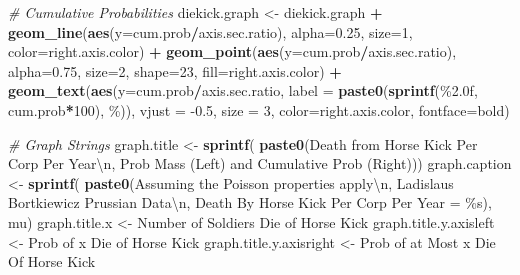 \documentclass[
]{book}
\newenvironment{Shaded}{\begin{snugshade}}{\end{snugshade}}
\newcommand{\CharTok}[1]{\textcolor[rgb]{0.31,0.60,0.02}{#1}}
\newcommand{\CommentTok}[1]{\textcolor[rgb]{0.56,0.35,0.01}{\textit{#1}}}
\newcommand{\DataTypeTok}[1]{\textcolor[rgb]{0.13,0.29,0.53}{#1}}
\newcommand{\DecValTok}[1]{\textcolor[rgb]{0.00,0.00,0.81}{#1}}
\newcommand{\FloatTok}[1]{\textcolor[rgb]{0.00,0.00,0.81}{#1}}
\newcommand{\KeywordTok}[1]{\textcolor[rgb]{0.13,0.29,0.53}{\textbf{#1}}}
\newcommand{\NormalTok}[1]{#1}
\newcommand{\OperatorTok}[1]{\textcolor[rgb]{0.81,0.36,0.00}{\textbf{#1}}}
\newcommand{\StringTok}[1]{\textcolor[rgb]{0.31,0.60,0.02}{#1}}
\begin{document}
\begin{Shaded}
\begin{Highlighting}[]
\CommentTok{\# Cumulative Probabilities}
\NormalTok{diekick.graph \textless{}{-}}\StringTok{ }\NormalTok{diekick.graph }\OperatorTok{+}
\StringTok{    }\KeywordTok{geom\_line}\NormalTok{(}\KeywordTok{aes}\NormalTok{(}\DataTypeTok{y=}\NormalTok{cum.prob}\OperatorTok{/}\NormalTok{axis.sec.ratio),}
              \DataTypeTok{alpha=}\FloatTok{0.25}\NormalTok{, }\DataTypeTok{size=}\DecValTok{1}\NormalTok{, }\DataTypeTok{color=}\NormalTok{right.axis.color) }\OperatorTok{+}
\StringTok{    }\KeywordTok{geom\_point}\NormalTok{(}\KeywordTok{aes}\NormalTok{(}\DataTypeTok{y=}\NormalTok{cum.prob}\OperatorTok{/}\NormalTok{axis.sec.ratio),}
               \DataTypeTok{alpha=}\FloatTok{0.75}\NormalTok{, }\DataTypeTok{size=}\DecValTok{2}\NormalTok{, }\DataTypeTok{shape=}\DecValTok{23}\NormalTok{, }\DataTypeTok{fill=}\NormalTok{right.axis.color) }\OperatorTok{+}
\StringTok{    }\KeywordTok{geom\_text}\NormalTok{(}\KeywordTok{aes}\NormalTok{(}\DataTypeTok{y=}\NormalTok{cum.prob}\OperatorTok{/}\NormalTok{axis.sec.ratio,}
                  \DataTypeTok{label =} \KeywordTok{paste0}\NormalTok{(}\KeywordTok{sprintf}\NormalTok{(}\StringTok{\textquotesingle{}\%2.0f\textquotesingle{}}\NormalTok{, cum.prob}\OperatorTok{*}\DecValTok{100}\NormalTok{), }\StringTok{\textquotesingle{}\%\textquotesingle{}}\NormalTok{)),}
              \DataTypeTok{vjust =} \FloatTok{{-}0.5}\NormalTok{, }\DataTypeTok{size =} \DecValTok{3}\NormalTok{, }\DataTypeTok{color=}\NormalTok{right.axis.color, }\DataTypeTok{fontface=}\StringTok{\textquotesingle{}bold\textquotesingle{}}\NormalTok{)}


\CommentTok{\# Graph Strings}
\NormalTok{graph.title \textless{}{-}}\StringTok{ }\KeywordTok{sprintf}\NormalTok{(}
    \KeywordTok{paste0}\NormalTok{(}\StringTok{\textquotesingle{}Death from Horse Kick Per Corp Per Year}\CharTok{\textbackslash{}n}\StringTok{\textquotesingle{}}\NormalTok{,}
           \StringTok{\textquotesingle{}Prob Mass (Left) and Cumulative Prob (Right)\textquotesingle{}}\NormalTok{))}
\NormalTok{graph.caption \textless{}{-}}\StringTok{ }\KeywordTok{sprintf}\NormalTok{(}
    \KeywordTok{paste0}\NormalTok{(}\StringTok{\textquotesingle{}Assuming the Poisson properties apply}\CharTok{\textbackslash{}n}\StringTok{\textquotesingle{}}\NormalTok{,}
           \StringTok{\textquotesingle{}Ladislaus Bortkiewicz Prussian Data}\CharTok{\textbackslash{}n}\StringTok{\textquotesingle{}}\NormalTok{,}
           \StringTok{\textquotesingle{}Death By Horse Kick Per Corp Per Year = \%s\textquotesingle{}}\NormalTok{), mu)}
\NormalTok{graph.title.x \textless{}{-}}\StringTok{ \textquotesingle{}Number of Soldiers Die of Horse Kick\textquotesingle{}}
\NormalTok{graph.title.y.axisleft \textless{}{-}}\StringTok{ \textquotesingle{}Prob of x Die of Horse Kick\textquotesingle{}}
\NormalTok{graph.title.y.axisright \textless{}{-}}\StringTok{ \textquotesingle{}Prob of at Most x Die Of Horse Kick\textquotesingle{}}


\end{Highlighting}
\end{Shaded}
\end{document}
